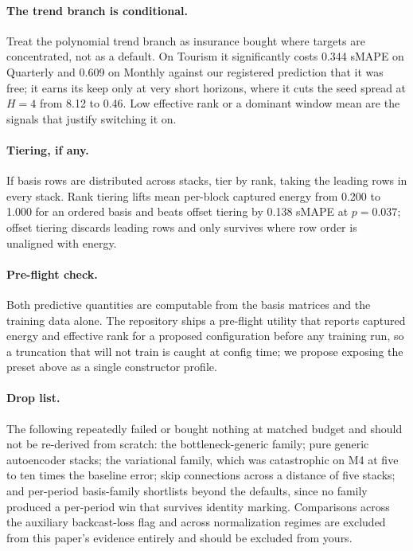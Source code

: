 \paragraph{The trend branch is conditional.}
Treat the polynomial trend branch as insurance bought where targets are
concentrated, not as a default. On Tourism it significantly costs 0.344
sMAPE on Quarterly and 0.609 on Monthly against our registered
prediction that it was free; it earns its keep only at very short
horizons, where it cuts the seed spread at $H = 4$ from 8.12 to 0.46.
Low effective rank or a dominant window mean are the signals that
justify switching it on.

\paragraph{Tiering, if any.}
If basis rows are distributed across stacks, tier by rank, taking the
leading rows in every stack. Rank tiering lifts mean per-block captured
energy from 0.200 to 1.000 for an ordered basis and beats offset tiering
by 0.138 sMAPE at $p = 0.037$; offset tiering discards leading rows and
only survives where row order is unaligned with energy.

\paragraph{Pre-flight check.}
Both predictive quantities are computable from the basis matrices and
the training data alone. The repository ships a pre-flight utility that
reports captured energy and effective rank for a proposed configuration
before any training run, so a truncation that will not train is caught
at config time; we propose exposing the preset above as a single
constructor profile.

\paragraph{Drop list.}
The following repeatedly failed or bought nothing at matched budget and
should not be re-derived from scratch: the bottleneck-generic family;
pure generic autoencoder stacks; the variational family, which was
catastrophic on M4 at five to ten times the baseline error; skip
connections across a distance of five stacks; and per-period basis-family
shortlists beyond the defaults, since no family produced a per-period win
that survives identity marking. Comparisons across the auxiliary
backcast-loss flag and across normalization regimes are excluded from
this paper's evidence entirely and should be excluded from yours.
